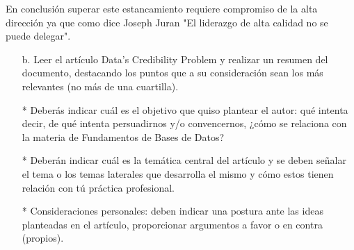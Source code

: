 \documentclass{article}
\begin{document}
En conclusión superar este estancamiento requiere compromiso de la alta dirección ya que como dice Joseph Juran "El liderazgo de alta calidad no se puede delegar".

\begin{itemize}
    \item[b.]Leer el artículo Data’s Credibility Problem y realizar un resumen del documento, destacando los puntos que a su consideración sean los más relevantes (no más de una cuartilla).
\end{itemize}
\begin{itemize}
    \item[*] Deberás indicar cuál es el objetivo que quiso plantear el autor: qué intenta decir, de qué intenta persuadirnos y/o convencernos, ¿cómo se relaciona con la materia de Fundamentos de Bases de Datos?
    \item[*] Deberán indicar cuál es la temática central del artículo y se deben señalar el tema o los temas laterales que desarrolla el mismo y cómo estos tienen relación con tú práctica profesional.
    \item[*] Consideraciones personales: deben indicar una postura ante las ideas planteadas en el artículo, proporcionar argumentos a favor o en contra (propios).
\end{itemize}

    
\end{document}
